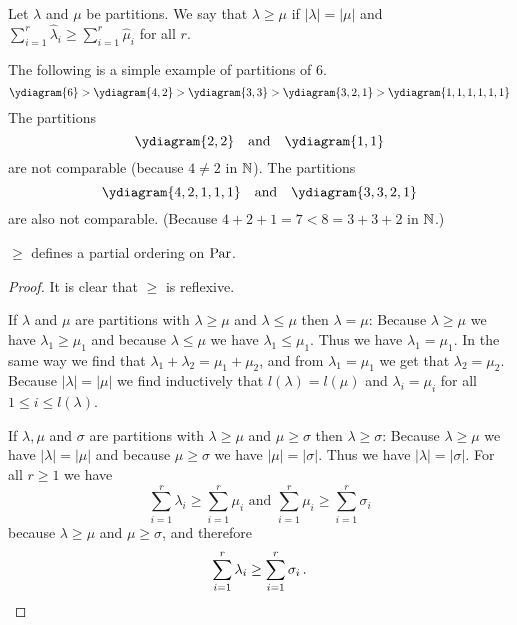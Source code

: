 \begin{defi}
  Let $\lambda$ and $\mu$ be partitions.
  We say that $\lambda \geq \mu$ if $|\lambda| = |\mu|$ and $\sum_{i=1}^r \hat{\lambda}_i \geq \sum_{i=1}^r \hat{\mu}_i$ for all $r$.
\end{defi}


\begin{expls}
  The following is a simple example of partitions of $6$.
  \[
      \ydiagram{6}
    > \ydiagram{4,2}
    > \ydiagram{3,3}
    > \ydiagram{3,2,1}
    > \ydiagram{1,1,1,1,1,1}
  \]
  The partitions
  \[
    \ydiagram{2,2}
    \quad \text{and} \quad
    \ydiagram{1,1}
  \]
  are not comparable (because $4 \neq 2$ in $\mathbb{N}$). The partitions
  \[
    \ydiagram{4,2,1,1,1}
    \quad \text{and} \quad
    \ydiagram{3,3,2,1}
  \]
  are also not comparable.
  (Because $4+2+1 = 7 < 8 = 3+3+2$ in $\mathbb{N}$.)
\end{expls}

\begin{lem}
  $\geq$ defines a partial ordering on $\operatorname{Par}$.
\end{lem}
\begin{proof}
  It is clear that $\geq$ is reflexive.
  
  If $\lambda$ and $\mu$ are partitions with $\lambda \geq \mu$ and $\lambda \leq \mu$ then $\lambda = \mu$:
  Because $\lambda \geq \mu$ we have $\lambda_1 \geq \mu_1$ and because $\lambda \leq \mu$ we have $\lambda_1 \leq \mu_1$.
  Thus we have $\lambda_1 = \mu_1$.
  In the same way we find that $\lambda_1 + \lambda_2 = \mu_1 + \mu_2$, and from $\lambda_1 = \mu_1$ we get that $\lambda_2 = \mu_2$.
  Because $|\lambda| = |\mu|$ we find inductively that $l(\lambda) = l(\mu)$ and $\lambda_i = \mu_i$ for all $1 \leq i \leq l(\lambda)$.
  
  If $\lambda, \mu$ and $\sigma$ are partitions with $\lambda \geq \mu$ and $\mu \geq \sigma$ then $\lambda \geq \sigma$:
  Because $\lambda \geq \mu$ we have $|\lambda| = |\mu|$ and because $\mu \geq \sigma$ we have $|\mu| = |\sigma|$.
  Thus we have $|\lambda| = |\sigma|$.
  For all $r \geq 1$ we have
  \[
          \sum_{i=1}^r \lambda_i
    \geq  \sum_{i=1}^r \mu_i
    \text{ and }
          \sum_{i=1}^r \mu_i
    \geq  \sum_{i=1}^r \sigma_i
  \]
  because $\lambda \geq \mu$ and $\mu \geq \sigma$, and therefore
  \[
          \sum_{i=1}^r \lambda_i
    \geq  \sum_{i=1}^r \sigma_i \,.
    \qedhere
  \]
\end{proof}


